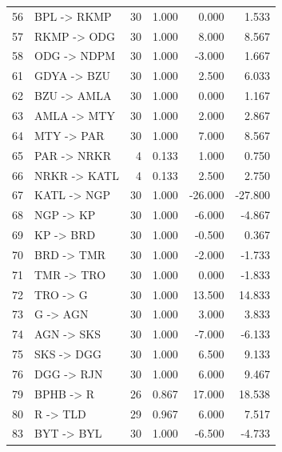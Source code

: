 \begin{longtable}{r p{} r r r r}
56 & BPL -> RKMP & 30 & 1.000 & 0.000 & 1.533 \\
57 & RKMP -> ODG & 30 & 1.000 & 8.000 & 8.567 \\
58 & ODG -> NDPM & 30 & 1.000 & -3.000 & 1.667 \\
61 & GDYA -> BZU & 30 & 1.000 & 2.500 & 6.033 \\
62 & BZU -> AMLA & 30 & 1.000 & 0.000 & 1.167 \\
63 & AMLA -> MTY & 30 & 1.000 & 2.000 & 2.867 \\
64 & MTY -> PAR & 30 & 1.000 & 7.000 & 8.567 \\
65 & PAR -> NRKR & 4 & 0.133 & 1.000 & 0.750 \\
66 & NRKR -> KATL & 4 & 0.133 & 2.500 & 2.750 \\
67 & KATL -> NGP & 30 & 1.000 & -26.000 & -27.800 \\
68 & NGP -> KP & 30 & 1.000 & -6.000 & -4.867 \\
69 & KP -> BRD & 30 & 1.000 & -0.500 & 0.367 \\
70 & BRD -> TMR & 30 & 1.000 & -2.000 & -1.733 \\
71 & TMR -> TRO & 30 & 1.000 & 0.000 & -1.833 \\
72 & TRO -> G & 30 & 1.000 & 13.500 & 14.833 \\
73 & G -> AGN & 30 & 1.000 & 3.000 & 3.833 \\
74 & AGN -> SKS & 30 & 1.000 & -7.000 & -6.133 \\
75 & SKS -> DGG & 30 & 1.000 & 6.500 & 9.133 \\
76 & DGG -> RJN & 30 & 1.000 & 6.000 & 9.467 \\
79 & BPHB -> R & 26 & 0.867 & 17.000 & 18.538 \\
80 & R -> TLD & 29 & 0.967 & 6.000 & 7.517 \\
83 & BYT -> BYL & 30 & 1.000 & -6.500 & -4.733 \\
\end{longtable}